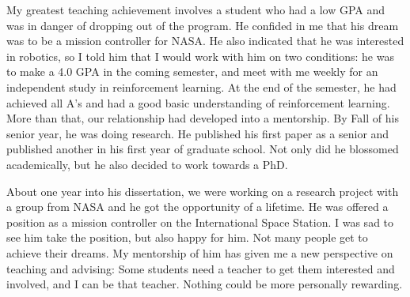 My greatest teaching achievement involves a student who had a low GPA and
was in danger of dropping out of the program. He confided in me that his
dream was to be a mission controller for NASA.  He also indicated that he
was interested in robotics, so I told him that I would work with him on two
conditions: he was to make a 4.0 GPA in the coming semester, and meet with
me weekly for an independent study in reinforcement learning.  At the end of
the semester, he had achieved all A's and had a good basic understanding of
reinforcement learning.  More than that, our relationship had developed into
a mentorship. By Fall of his senior year, he was doing research. He
published his first paper as a senior and published another in his first
year of graduate school. Not only did he blossomed academically, but he also
decided to work towards a PhD.  

About one year into his dissertation, we were working on a research project
with a group from NASA and he got the opportunity of a lifetime.  He was
offered a position as a mission controller on the International Space
Station.  I was sad to see him take the position, but also happy for him.
Not many people get to achieve their dreams. My mentorship of him has given
me a new perspective on teaching and advising: Some students need a teacher
to get them interested and involved, and I can be that teacher.  Nothing
could be more personally rewarding.





